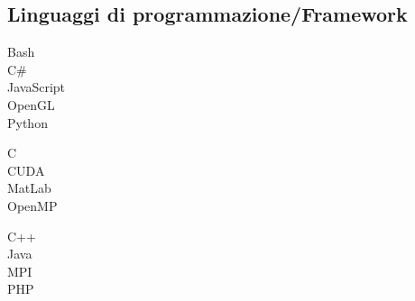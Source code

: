 \documentclass[curriculum-vitae]{subfiles}
\begin{document}
		\subsection*{Linguaggi di programmazione/Framework}
			\begin{minipage}[t]{.3\textwidth}
				Bash \hfill {}\\
				C\# \hfill {}\\
				JavaScript \hfill {}\\
				OpenGL \hfill {}\\
				Python \hfill {}\\  %
			\end{minipage}
			\hfill
			\begin{minipage}[t]{.3\textwidth}
				C \hfill {}\\
				CUDA \hfill {}\\
				MatLab \hfill {}\\
				OpenMP \hfill {}\\  %
			\end{minipage}
			\hfill
			\begin{minipage}[t]{.3\textwidth}
				C++ \hfill {}\\
				Java \hfill {}\\
				MPI \hfill {}\\
				PHP \hfill {}\\  %
			\end{minipage}
		
\end{document}
